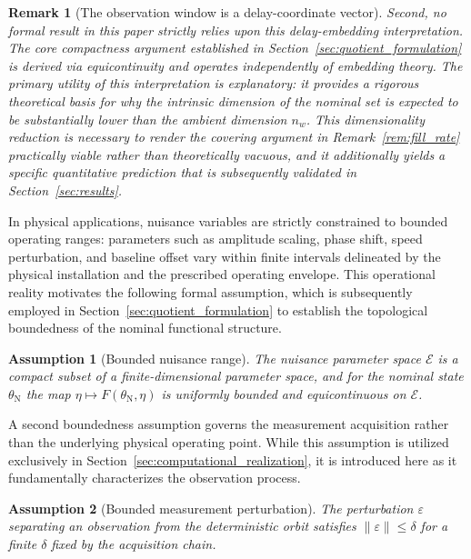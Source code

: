 \documentclass[a4paper]{cas-sc}
\newtheorem{assumption}{Assumption}
\newtheorem{remark}{Remark}
\newcommand{\EtaSpace}{\ensuremath{\mathcal{E}}}
\begin{document}
\begin{remark}[The observation window is a delay-coordinate vector]
Second, no formal result in this paper strictly relies upon this delay-embedding interpretation. The core compactness argument established in Section~\ref{sec:quotient_formulation} is derived via equicontinuity and operates independently of embedding theory. The primary utility of this interpretation is explanatory: it provides a rigorous theoretical basis for why the intrinsic dimension of the nominal set is expected to be substantially lower than the ambient dimension \(n_w\). This dimensionality reduction is necessary to render the covering argument in Remark~\ref{rem:fill_rate} practically viable rather than theoretically vacuous, and it additionally yields a specific quantitative prediction that is subsequently validated in Section~\ref{sec:results}.
\end{remark}

In physical applications, nuisance variables are strictly constrained to bounded operating ranges: parameters such as amplitude scaling, phase shift, speed perturbation, and baseline offset vary within finite intervals delineated by the physical installation and the prescribed operating envelope. This operational reality motivates the following formal assumption, which is subsequently employed in Section~\ref{sec:quotient_formulation} to establish the topological boundedness of the nominal functional structure.

\begin{assumption}[Bounded nuisance range]
\label{ass:compact_eta}
The nuisance parameter space \(\EtaSpace\) is a compact subset of a
finite-dimensional parameter space, and for the nominal state
\(\theta_{\mathrm{N}}\) the map \(\eta \mapsto F(\theta_{\mathrm{N}},\eta)\)
is uniformly bounded and equicontinuous on \(\EtaSpace\).
\end{assumption}

A second boundedness assumption governs the measurement acquisition rather than the underlying physical operating point. While this assumption is utilized exclusively in Section~\ref{sec:computational_realization}, it is introduced here as it fundamentally characterizes the observation process.

\begin{assumption}[Bounded measurement perturbation]
\label{ass:bounded_noise}
The perturbation \(\varepsilon\) separating an observation from the
deterministic orbit satisfies \(\lVert\varepsilon\rVert\le\delta\) for a
finite \(\delta\) fixed by the acquisition chain.
\end{assumption}
\end{document}
